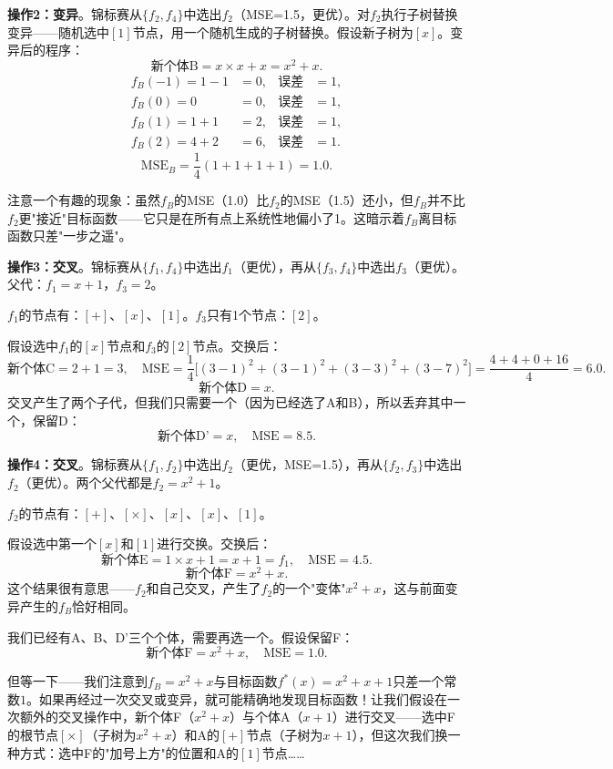 \documentclass[lang=cn,zihao=-4,a4paper,fontset=windows]{beautybook}
\begin{document}
\textbf{操作2：变异}。锦标赛从$\{f_2, f_4\}$中选出$f_2$（MSE=1.5，更优）。对$f_2$执行子树替换变异——随机选中$[1]$节点，用一个随机生成的子树替换。假设新子树为$[x]$。变异后的程序：
\[
\text{新个体B} = x \times x + x = x^2 + x.
\]
\begin{align*}
f_B(-1) = 1 - 1 &= 0, & \text{误差} &= 1, \\
f_B(0) = 0 &= 0, & \text{误差} &= 1, \\
f_B(1) = 1 + 1 &= 2, & \text{误差} &= 1, \\
f_B(2) = 4 + 2 &= 6, & \text{误差} &= 1.
\end{align*}
\[
\text{MSE}_B = \frac{1}{4}(1 + 1 + 1 + 1) = 1.0.
\]

注意一个有趣的现象：虽然$f_B$的MSE（1.0）比$f_2$的MSE（1.5）还小，但$f_B$并不比$f_2$更"接近"目标函数——它只是在所有点上系统性地偏小了1。这暗示着$f_B$离目标函数只差"一步之遥"。

\textbf{操作3：交叉}。锦标赛从$\{f_1, f_4\}$中选出$f_1$（更优），再从$\{f_3, f_4\}$中选出$f_3$（更优）。父代：$f_1 = x + 1$，$f_3 = 2$。

$f_1$的节点有：$[+]$、$[x]$、$[1]$。$f_3$只有1个节点：$[2]$。

假设选中$f_1$的$[x]$节点和$f_3$的$[2]$节点。交换后：
\[
\text{新个体C} = 2 + 1 = 3, \quad \text{MSE} = \frac{1}{4}\big[(3-1)^2 + (3-1)^2 + (3-3)^2 + (3-7)^2\big] = \frac{4+4+0+16}{4} = 6.0.
\]
\[
\text{新个体D} = x.
\]
交叉产生了两个子代，但我们只需要一个（因为已经选了A和B），所以丢弃其中一个，保留D：
\[
\text{新个体D'} = x, \quad \text{MSE} = 8.5.
\]

\textbf{操作4：交叉}。锦标赛从$\{f_1, f_2\}$中选出$f_2$（更优，MSE=1.5），再从$\{f_2, f_3\}$中选出$f_2$（更优）。两个父代都是$f_2 = x^2 + 1$。

$f_2$的节点有：$[+]$、$[\times]$、$[x]$、$[x]$、$[1]$。

假设选中第一个$[x]$和$[1]$进行交换。交换后：
\[
\text{新个体E} = 1 \times x + 1 = x + 1 = f_1, \quad \text{MSE} = 4.5.
\]
\[
\text{新个体F} = x^2 + x.
\]
这个结果很有意思——$f_2$和自己交叉，产生了$f_2$的一个"变体"$x^2 + x$，这与前面变异产生的$f_B$恰好相同。

我们已经有A、B、D'三个个体，需要再选一个。假设保留F：
\[
\text{新个体F} = x^2 + x, \quad \text{MSE} = 1.0.
\]

但等一下——我们注意到$f_B = x^2 + x$与目标函数$f^*(x) = x^2 + x + 1$只差一个常数$1$。如果再经过一次交叉或变异，就可能精确地发现目标函数！让我们假设在一次额外的交叉操作中，新个体F（$x^2 + x$）与个体A（$x + 1$）进行交叉——选中F的根节点$[\times]$（子树为$x^2 + x$）和A的$[+]$节点（子树为$x+1$），但这次我们换一种方式：选中F的"加号上方"的位置和A的$[1]$节点……
\end{document}
